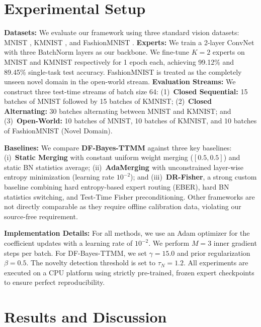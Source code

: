 \documentclass{article}
\theoremstyle{plain}
\theoremstyle{definition}
\theoremstyle{remark}
\begin{document}
\section{Experimental Setup}\vspace{-0.1in}
\label{sec:experimental_setup}

\textbf{Datasets:} We evaluate our framework using three standard vision datasets: MNIST
\cite{LeCun1998}, KMNIST \cite{Clanuwat2018}, and FashionMNIST \cite{Xiao2017}.
\textbf{Experts:} We train a 2-layer ConvNet with three BatchNorm layers as our backbone. We
fine-tune $K=2$ experts on MNIST and KMNIST respectively for 1 epoch each, achieving 99.12\% and
89.45\% single-task test accuracy. FashionMNIST is treated as the completely unseen novel domain in
the open-world stream.
\textbf{Evaluation Streams:} We construct three test-time streams of batch size 64: (1)~\textbf{Closed Sequential:} 15 batches of MNIST followed by 15 batches of KMNIST; (2)~\textbf{Closed Alternating:} 30 batches alternating between MNIST and KMNIST; and (3)~\textbf{Open-World:} 10 batches of MNIST, 10 batches of KMNIST, and 10 batches of FashionMNIST (Novel Domain).

\textbf{Baselines:} We compare \textbf{DF-Bayes-TTMM} against three key baselines: 
(i)~\textbf{Static Merging} with constant uniform weight merging ($[0.5, 0.5]$) and static BN statistics average; (ii)~\textbf{AdaMerging \cite{Yang2024}} with unconstrained layer-wise entropy minimization (learning rate $10^{-2}$); and (iii)~\textbf{DR-Fisher}, a strong custom baseline combining hard entropy-based expert routing (EBER), hard BN statistics switching, and Test-Time Fisher preconditioning. Other frameworks are not directly comparable as they require offline calibration data, violating our source-free requirement.

\textbf{Implementation Details:} For all methods, we use an Adam optimizer for the coefficient
updates with a learning rate of $10^{-2}$. We perform $M=3$ inner gradient steps per batch. For
DF-Bayes-TTMM, we set $\gamma = 15.0$ and prior regularization $\beta = 0.5$. The novelty detection
threshold is set to $\tau_N = 1.2$. All experiments are executed on a CPU platform using strictly
pre-trained, frozen expert checkpoints to ensure perfect reproducibility.

\section{Results and Discussion}\vspace{-0.1in}
\label{sec:results}
\end{document}
